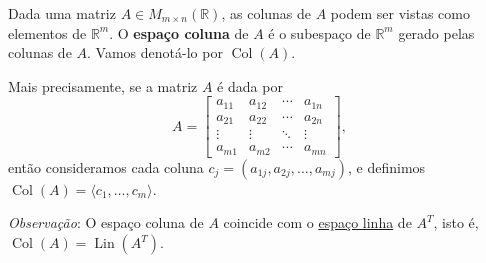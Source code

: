 \begin{definition}
	Dada uma matriz $A\in M_{m\times n}(\mathbb{R})$, as colunas de $A$ podem ser vistas como elementos de $\mathbb{R}^m$. O \textbf{espaço coluna} de $A$ é o subespaço de $\mathbb{R}^m$ gerado pelas colunas de $A$. Vamos denotá-lo por $\operatorname{Col}(A)$.

	Mais precisamente, se a matriz $A$ é dada por
	\[A=\begin{bmatrix}
		a_{11}
			&a_{12}
				&\cdots
					&a_{1n}\\
		a_{21}
			&a_{22}
				&\cdots
					&a_{2n}\\
		\vdots
			&\vdots
				&\ddots
					&\vdots\\
		a_{m1}
			&a_{m2}
				&\cdots
					&a_{mn}
		\end{bmatrix},\]
	então consideramos cada coluna $c_j=(a_{1j},a_{2j},\ldots,a_{mj})$, e definimos $\operatorname{Col}(A)=\langle c_1,\ldots,c_m\rangle$.
\end{definition}

\textit{Observação}: O espaço coluna de $A$ coincide com o \href{http://mtm.ufsc.br/~cordeiro/ensino/mtm3112.algebra.linear/08.espacos.de.matrizes/con_esp_linha_moodle.html}{espaço linha} de $A^T$, isto é, $\operatorname{Col}(A)=\operatorname{Lin}(A^T)$.